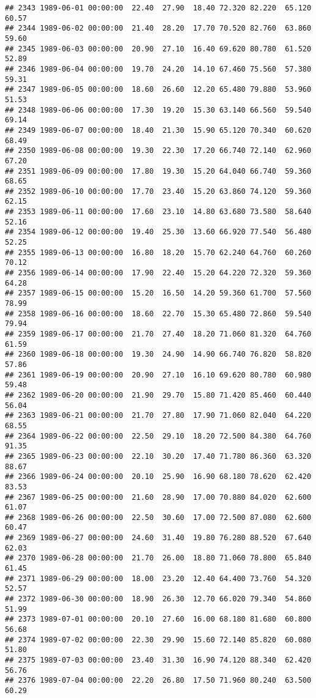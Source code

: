 \documentclass{article}\usepackage{graphicx, color}
\makeatletter
\newenvironment{kframe}{%
 \def\at@end@of@kframe{}%
 \ifinner\ifhmode%
  \def\at@end@of@kframe{\end{minipage}}%
  \begin{minipage}{\columnwidth}%
 \fi\fi%
 \def\FrameCommand##1{\hskip\@totalleftmargin \hskip-\fboxsep
 \colorbox{shadecolor}{##1}\hskip-\fboxsep
     \hskip-\linewidth \hskip-\@totalleftmargin \hskip\columnwidth}%
 \MakeFramed {\advance\hsize-\width
   \@totalleftmargin\z@ \linewidth\hsize
   \@setminipage}}%
 {\par\unskip\endMakeFramed%
 \at@end@of@kframe}
\newenvironment{knitrout}{}{} %
\makeatother
\begin{document}
\begin{knitrout}
\begin{kframe}
\begin{verbatim}
## 2343 1989-06-01 00:00:00  22.40  27.90  18.40 72.320 82.220  65.120  60.57
## 2344 1989-06-02 00:00:00  21.40  28.20  17.70 70.520 82.760  63.860  59.60
## 2345 1989-06-03 00:00:00  20.90  27.10  16.40 69.620 80.780  61.520  52.89
## 2346 1989-06-04 00:00:00  19.70  24.20  14.10 67.460 75.560  57.380  59.31
## 2347 1989-06-05 00:00:00  18.60  26.60  12.20 65.480 79.880  53.960  51.53
## 2348 1989-06-06 00:00:00  17.30  19.20  15.30 63.140 66.560  59.540  69.14
## 2349 1989-06-07 00:00:00  18.40  21.30  15.90 65.120 70.340  60.620  68.49
## 2350 1989-06-08 00:00:00  19.30  22.30  17.20 66.740 72.140  62.960  67.20
## 2351 1989-06-09 00:00:00  17.80  19.30  15.20 64.040 66.740  59.360  68.65
## 2352 1989-06-10 00:00:00  17.70  23.40  15.20 63.860 74.120  59.360  62.15
## 2353 1989-06-11 00:00:00  17.60  23.10  14.80 63.680 73.580  58.640  52.16
## 2354 1989-06-12 00:00:00  19.40  25.30  13.60 66.920 77.540  56.480  52.25
## 2355 1989-06-13 00:00:00  16.80  18.20  15.70 62.240 64.760  60.260  70.12
## 2356 1989-06-14 00:00:00  17.90  22.40  15.20 64.220 72.320  59.360  64.28
## 2357 1989-06-15 00:00:00  15.20  16.50  14.20 59.360 61.700  57.560  78.99
## 2358 1989-06-16 00:00:00  18.60  22.70  15.30 65.480 72.860  59.540  79.94
## 2359 1989-06-17 00:00:00  21.70  27.40  18.20 71.060 81.320  64.760  61.59
## 2360 1989-06-18 00:00:00  19.30  24.90  14.90 66.740 76.820  58.820  57.86
## 2361 1989-06-19 00:00:00  20.90  27.10  16.10 69.620 80.780  60.980  59.48
## 2362 1989-06-20 00:00:00  21.90  29.70  15.80 71.420 85.460  60.440  56.04
## 2363 1989-06-21 00:00:00  21.70  27.80  17.90 71.060 82.040  64.220  68.55
## 2364 1989-06-22 00:00:00  22.50  29.10  18.20 72.500 84.380  64.760  91.35
## 2365 1989-06-23 00:00:00  22.10  30.20  17.40 71.780 86.360  63.320  88.67
## 2366 1989-06-24 00:00:00  20.10  25.90  16.90 68.180 78.620  62.420  83.53
## 2367 1989-06-25 00:00:00  21.60  28.90  17.00 70.880 84.020  62.600  61.07
## 2368 1989-06-26 00:00:00  22.50  30.60  17.00 72.500 87.080  62.600  60.47
## 2369 1989-06-27 00:00:00  24.60  31.40  19.80 76.280 88.520  67.640  62.03
## 2370 1989-06-28 00:00:00  21.70  26.00  18.80 71.060 78.800  65.840  61.45
## 2371 1989-06-29 00:00:00  18.00  23.20  12.40 64.400 73.760  54.320  52.57
## 2372 1989-06-30 00:00:00  18.90  26.30  12.70 66.020 79.340  54.860  51.99
## 2373 1989-07-01 00:00:00  20.10  27.60  16.00 68.180 81.680  60.800  56.68
## 2374 1989-07-02 00:00:00  22.30  29.90  15.60 72.140 85.820  60.080  51.80
## 2375 1989-07-03 00:00:00  23.40  31.30  16.90 74.120 88.340  62.420  56.76
## 2376 1989-07-04 00:00:00  22.20  26.80  17.50 71.960 80.240  63.500  60.29

\end{verbatim}
\end{kframe}
\end{knitrout}
\end{document}
